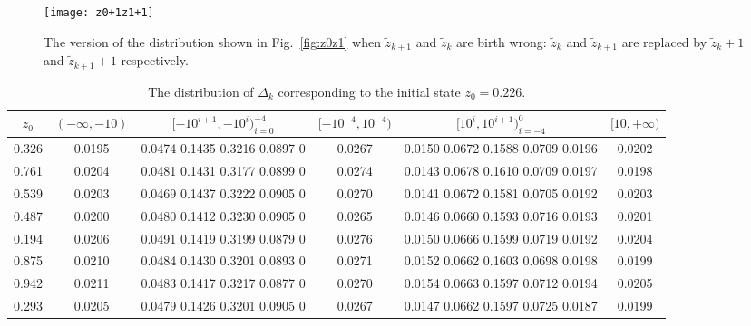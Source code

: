 \documentclass[twocolumn]{svjour3}
\newlength\imagewidth
\begin{document}
\begin{figure}[!htb]
\centering
\begin{minipage}[t]{\imagewidth}
\centering
\texttt{[image: z0+1z1+1]}
\end{minipage}
\caption{The version of the distribution shown in Fig.~\ref{fig:z0z1} when $\tilde{z}_{k+1}$
and $\tilde{z}_{k}$ are birth wrong: $\tilde{z}_{k}$ and $\tilde{z}_{k+1}$ are replaced by $\tilde{z}_{k}+1$ and $\tilde{z}_{k+1}+1$ respectively.}
\label{fig:z0+1z1+1}
\end{figure}

\begin{table*}[!htp]
\center\caption{The distribution of $\Delta_k$ corresponding to the initial state $z_0=0.226$.}
\begin{tabular}{c|c|c|c|c|c}
  \hline  $z_0$  & $(-\infty, -10)$     &  $[-10^{i+1}, -10^{i})_{i=0}^{-4}$       & $[-10^{-4}, 10^{-4})$ &    $[10^{i}, 10^{i+1})_{i=-4}^0$& $[10,+\infty )$\\
  \hline  0.326  & 0.0195 & 0.0474    0.1435    0.3216    0.0897   0 & 0.0267 &   0.0150    0.0672    0.1588    0.0709    0.0196        & 0.0202       \\
  \hline  0.761  & 0.0204 & 0.0481    0.1431    0.3177    0.0899   0 & 0.0274 &   0.0143    0.0678    0.1610    0.0709    0.0197        & 0.0198       \\
  \hline  0.539  & 0.0203 & 0.0469    0.1437    0.3222    0.0905   0 & 0.0270 &   0.0141    0.0672    0.1581    0.0705    0.0192        & 0.0203       \\
  \hline  0.487  & 0.0200 & 0.0480    0.1412    0.3230    0.0905   0 & 0.0265 &   0.0146    0.0660    0.1593    0.0716    0.0193        & 0.0201       \\
  \hline  0.194  & 0.0206 & 0.0491    0.1419    0.3199    0.0879   0 & 0.0276 &   0.0150    0.0666    0.1599    0.0719    0.0192        & 0.0204       \\
  \hline  0.875  & 0.0210 & 0.0484    0.1430    0.3201    0.0893   0 & 0.0271 &   0.0152    0.0662    0.1603    0.0698    0.0198        & 0.0199       \\
  \hline  0.942  & 0.0211 & 0.0483    0.1417    0.3217    0.0877   0 & 0.0270 &   0.0154    0.0663    0.1597    0.0712    0.0194        & 0.0205       \\
  \hline  0.293  & 0.0205 & 0.0479    0.1426    0.3201    0.0905   0 & 0.0267 &   0.0147    0.0662    0.1597    0.0725    0.0187        & 0.0199       \\
  \hline
\end{tabular}
\label{table:distributionerror}
\end{table*}
\end{document}
